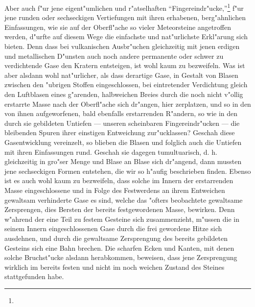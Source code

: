 \documentclass[a4paper, 8pt, oneside, polutonikogreek, german]{article}
\begin{document}
Aber auch f"ur jene eigent"umlichen und r"atselhaften "`Fingereindr"ucke,"'\footnote{} f"ur jene runden oder sechseckigen Vertiefungen mit ihren erhabenen, berg"ahnlichen Einfassungen, wie sie auf der Oberfl"ache so vieler Meteorsteine angetroffen werden, d"urfte auf diesem Wege die einfachste und nat"urlichste Erkl"arung sich bieten. Denn dass bei vulkanischen Ausbr"uchen gleichzeitig mit jenen erdigen und metallischen D"unsten auch noch andere permanente oder schwer zu verdichtende Gase den Kratern entsteigen, ist wohl kaum zu bezweifeln. Was ist aber alsdann wohl nat"urlicher, als dass derartige Gase, in Gestalt von Blasen zwischen den "ubrigen Stoffen eingeschlossen, bei eintretender Verdichtung gleich den Luftblasen eines g"arenden, halbweichen Breies durch die noch nicht v"ollig erstarrte Masse nach der Oberfl"ache sich dr"angen, hier zerplatzen, und so in den von ihnen aufgeworfenen, bald ebenfalls erstarrenden R"andern, so wie in den durch sie gebildeten Untiefen --- unseren scheinbaren Fingereindr"ucken --- die bleibenden Spuren ihrer einstigen Entweichung zur"ucklassen? Geschah diese Gasentwicklung vereinzelt, so blieben die Blasen und folglich auch die Untiefen mit ihren Einfassungen rund. Geschah sie dagegen tumultuarisch, d. h. gleichzeitig in gro"ser Menge und Blase an Blase sich dr"angend, dann mussten jene sechseckigen Formen entstehen, die wir so h"aufig beschrieben finden. Ebenso ist es auch wohl kaum zu bezweifeln, dass solche im Innern der erstarrenden Masse eingeschlossene und in Folge des Festwerdens an ihrem Entweichen gewaltsam verhinderte Gase es sind, welche das "ofters beobachtete gewaltsame Zersprengen, dies Bersten der bereits festgewordenen Masse, bewirken. Denn w"ahrend der eine Teil zu festem Gesteine sich zusammenzieht, m"ussen die in seinem Innern eingeschlossenen Gase durch die frei gewordene Hitze sich ausdehnen, und durch die gewaltsame Zersprengung des bereits gebildeten Gesteins sich eine Bahn brechen. Die scharfen Ecken und Kanten, mit denen solche Bruchst"ucke alsdann herabkommen, beweisen, dass jene Zersprengung wirklich im bereits festen und nicht im noch weichen Zustand des Steines stattgefunden habe.
\end{document}
